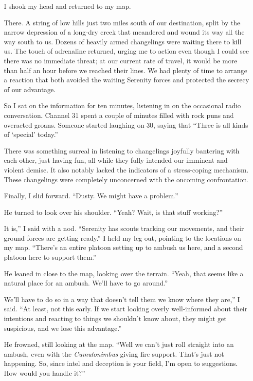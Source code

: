 I shook my head and returned to my map.

There. A string of low hills just two miles south of our destination, split by the narrow depression of a long-dry creek that meandered and wound its way all the way south to us. Dozens of heavily armed changelings were waiting there to kill us. The touch of adrenaline returned, urging me to action even though I could see there was no immediate threat; at our current rate of travel, it would be more than half an hour before we reached their lines. We had plenty of time to arrange a reaction that both avoided the waiting Serenity forces and protected the secrecy of our advantage.

So I sat on the information for ten minutes, listening in on the occasional radio conversation. Channel 31 spent a couple of minutes filled with rock puns and overacted groans. Someone started laughing on 30, saying that “Three is all kinds of ‘special’ today.”

There was something surreal in listening to changelings joyfully bantering with each other, just having fun, all while they fully intended our imminent and violent demise. It also notably lacked the indicators of a stress-coping mechanism. These changelings were completely unconcerned with the oncoming confrontation.

Finally, I slid forward. “Dusty. We might have a problem.”

He turned to look over his shoulder. “Yeah? Wait, is that stuff working?”

\leavevmode{}It is,” I said with a nod. “Serenity has scouts tracking our movements, and their ground forces are getting ready.” I held my leg out, pointing to the locations on my map. “There’s an entire platoon setting up to ambush us here, and a second platoon here to support them.”

He leaned in close to the map, looking over the terrain. “Yeah, that seems like a natural place for an ambush. We’ll have to go around.”

\leavevmode{}We’ll have to do so in a way that doesn’t tell them we know where they are,” I said. “At least, not this early. If we start looking overly well-informed about their intentions and reacting to things we shouldn’t know about, they might get suspicious, and we lose this advantage.”

He frowned, still looking at the map. “Well we can’t just roll straight into an ambush, even with the \textit{Cumulonimbus} giving fire support. That’s just not happening. So, since intel and deception is your field, I’m open to suggestions. How would you handle it?”

